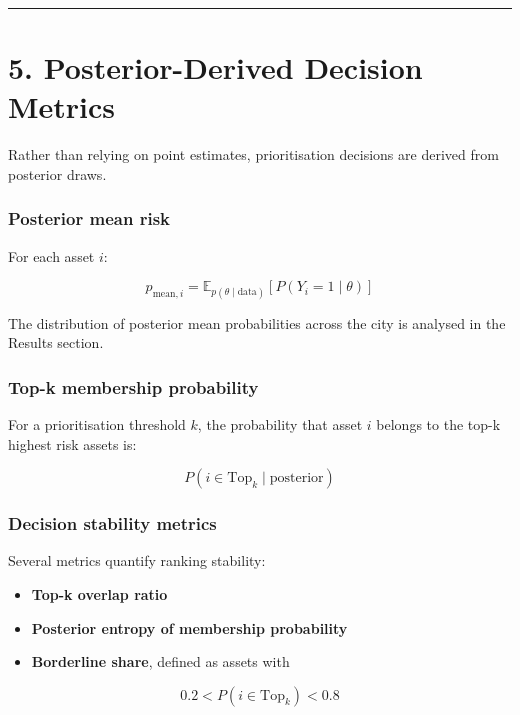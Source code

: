 \documentclass[
]{article}
\providecommand{\tightlist}{%
  \setlength{\itemsep}{0pt}\setlength{\parskip}{0pt}}
\begin{document}
\begin{center}\rule{0.5\linewidth}{0.5pt}\end{center}

\section{5. Posterior-Derived Decision
Metrics}\label{posterior-derived-decision-metrics}

Rather than relying on point estimates, prioritisation decisions are
derived from posterior draws.

\subsubsection{Posterior mean risk}\label{posterior-mean-risk}

For each asset \(i\):

\[
p_{\text{mean}, i}
=
\mathbb{E}_{p(\theta \mid \text{data})}
\left[
P(Y_i = 1 \mid \theta)
\right]
\]

The distribution of posterior mean probabilities across the city is
analysed in the Results section.

\subsubsection{Top-k membership
probability}\label{top-k-membership-probability}

For a prioritisation threshold \(k\), the probability that asset \(i\)
belongs to the top-k highest risk assets is:

\[
P(i \in \text{Top}_k \mid \text{posterior})
\]

\subsubsection{Decision stability
metrics}\label{decision-stability-metrics}

Several metrics quantify ranking stability:

\begin{itemize}
\tightlist
\item
  \textbf{Top-k overlap ratio}
\item
  \textbf{Posterior entropy of membership probability}
\item
  \textbf{Borderline share}, defined as assets with
\end{itemize}

\[
0.2 < P(i \in \text{Top}_k) < 0.8
\]
\end{document}
